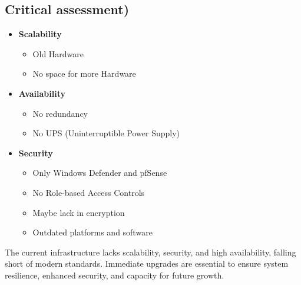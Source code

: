 \subsection{Critical assessment)}
\label{sec:critical_assessment}

\begin{itemize}
    \item \textbf{Scalability}
    \begin{itemize}
        \item Old Hardware
        \item No space for more Hardware
    \end{itemize}
    
    \item \textbf{Availability}
    \begin{itemize}
        \item No redundancy
        \item No UPS (Uninterruptible Power Supply)
    \end{itemize}
    
    \item \textbf{Security}
    \begin{itemize}
        \item Only Windows Defender and pfSense
        \item No Role-based Access Controls
        \item Maybe lack in encryption
        \item Outdated platforms and software
    \end{itemize}
\end{itemize}

The current infrastructure lacks scalability, security, and high availability, falling short of modern standards. Immediate upgrades are essential to ensure system resilience, enhanced security, and capacity for future growth.





